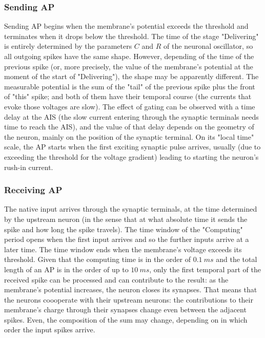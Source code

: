 \subsubsection{Sending AP\label{sec:Single_SendingAP}}
Sending 
\gls{AP}
begins when the membrane's potential exceeds the threshold
and terminates when it drops below the threshold. The time of
the stage "Delivering" is entirely determined by the parameters
$C$ and $R$ of the neuronal oscillator, so all outgoing spikes have the same shape. However,
depending of the time of the previous spike (or, more precisely,
the value of the membrane's potential at the moment of the start of "Delivering"), the shape may be apparently different.
The measurable potential is the sum of the "tail" of the 
previous spike plus the front of "this" spike; and both of them have
their temporal course (the currents that evoke those voltages are slow).
The effect of gating can be observed with a time delay at the 
\gls{AIS}
(the slow current entering through the synaptic terminals needs time to reach the AIS), and the value of that delay depends on the geometry of the neuron,
mainly on the position of the synaptic terminal.
On its "\gls{local time}" scale, the \gls{AP} starts when
the first exciting synaptic pulse arrives,
usually (due to exceeding the threshold for the voltage gradient)
leading to starting the neuron's rush-in current.


\subsubsection{Receiving AP\label{sec:Single_ReceivingAP}}

The native input arrives through the synaptic terminals, at the 
time determined by the upstream neuron (in the sense that 
at what absolute time it sends the spike and how long the spike travels).
The time window of the "Computing" period opens when the first
input arrives and so the further inputs arrive at a later time.
The time window ends when the membrane's voltage exceeds its threshold.
Given that the computing time is in the order of $0.1\ ms$
and the total length of an
AP 
is in the order of up to $10\ ms$,
only the first temporal part of the received spike can be processed and can contribute
to the result: as the membrane's potential increases, the neuron
closes its synapses. That means that the neurons coooperate with
their upstream neurons: the contributions to their membrane's charge through their synapses change
even between the adjacent spikes. Even, the composition of the sum
may change, depending on in which order the input spikes arrive. 




